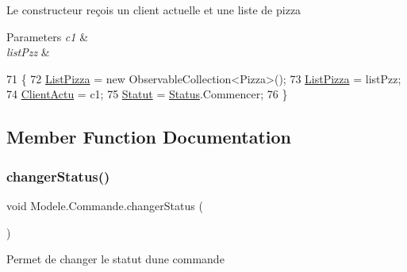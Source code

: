 Le constructeur reçois un client actuelle et une liste de pizza 


\begin{DoxyParams}{Parameters}
{\em c1} & \\
\hline
{\em list\+Pzz} & \\
\hline
\end{DoxyParams}

\begin{DoxyCode}
71         \{
72             \hyperlink{classModele_1_1Commande_a296c71bf31f1e6383e63d842ceb0bfe6}{ListPizza} = \textcolor{keyword}{new} ObservableCollection<Pizza>();
73             \hyperlink{classModele_1_1Commande_a296c71bf31f1e6383e63d842ceb0bfe6}{ListPizza} = listPzz;
74             \hyperlink{classModele_1_1Commande_ad9f1418f7febfa94bcb57873d3ac6be4}{ClientActu} = c1;
75             \hyperlink{classModele_1_1Commande_af468b3432c93b1c7929b2af8154386a6}{Statut} = \hyperlink{namespaceModele_a7de67c7bf55b42ee1c5fea81ed793eb1}{Status}.Commencer;
76         \}
\end{DoxyCode}


\subsection{Member Function Documentation}
\mbox{\label{classModele_1_1Commande_ab3f6329bfa0cf9e06a2fb15184c490c3}} 
\subsubsection{\texorpdfstring{changer\+Status()}{changerStatus()}}
{\footnotesize\ttfamily void Modele.\+Commande.\+changer\+Status (\begin{DoxyParamCaption}{ }\end{DoxyParamCaption})\hspace{0.3cm}{\ttfamily [inline]}}



Permet de changer le statut d\textquotesingle{}une commande 


